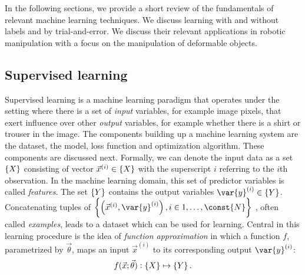 \documentclass[\home/main.tex]{subfiles}
\begin{document}
In the following sections, we provide a short review of the fundamentals of relevant machine learning techniques. We discuss learning with and without labels and by trial-and-error. We discuss their relevant applications in robotic manipulation with a focus on the manipulation of deformable objects. 

\subsection{Supervised learning}

Supervised learning is a machine learning paradigm that operates under the setting where there is a set of \textit{input} variables, for example image pixels, that exert influence over other \textit{output} variables, for example whether there is a shirt or trouser in the image.
The components building up a machine learning system are the dataset, the model, loss function and optimization algorithm. These components are discussed next. 
Formally, we can denote the input data as a set $\set{X}$ consisting of vector $\vec{x}^{(i)} \in \set{X} $ with the superscript $i$ referring to the $i$th observation. In the machine learning domain, this set of predictor variables is called \textit{features}. The set $\set{Y}$ contains the output variables $\var{y}^{(i)} \in \set{Y}$. Concatenating tuples of
$\left\{\left(\vec{x}^{(i)}, \var{y}^{(i)}\right) , i \in 1,\dots,\const{N} \right\}$
, often called \textit{examples}, leads to a dataset which can be used for learning. Central in this learning procedure is the idea of \textit{function approximation} in which a function $f$, parametrized by $\vec{\theta}$, maps an input $\vec{x}^{(i)}$ to its corresponding output $\var{y}^{(i)}$:
\begin{equation*}
	f(\vec{x};\vec{\theta}): \set{X} \mapsto \set{Y}\text{.}
\end{equation*}
\end{document}
